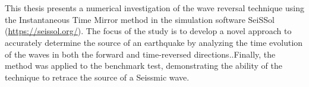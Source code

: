 \chapter{\abstractname}

This thesis presents a numerical investigation of the wave reversal technique using the Instantaneous 
Time Mirror method in the simulation software SeiSSol (\href{https://seissol.org/}{https://seissol.org/}). The focus of 
the study is to develop a novel approach to accurately determine the source of an earthquake by analyzing the time evolution 
of the waves in both the forward and time-reversed directions..Finally, the method was applied to the benchmark test, 
demonstrating the ability of the technique to retrace the source of a Seissmic wave.